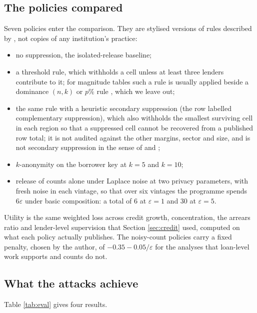 \documentclass[11pt,a4paper]{article}
\theoremstyle{plain}
\theoremstyle{definition}
\begin{document}
\subsection{The policies compared}\label{sec:eval-policies}

Seven policies enter the comparison. They are stylised versions of rules
described by \citet{hundepool2012}, not copies of any institution's practice:

\begin{itemize}
\item no suppression, the isolated-release baseline;
\item a threshold rule, which withholds a cell unless at least three lenders
  contribute to it; for magnitude tables such a rule is usually applied beside a
  dominance $(n,k)$ or $p\%$ rule \citep[ch.~4]{hundepool2012}, which we leave out;
\item the same rule with a heuristic secondary suppression (the row labelled
  complementary suppression), which also withholds the smallest surviving cell in
  each region so that a suppressed cell cannot be recovered from a published row
  total; it is not audited against the other margins, sector and size, and is not
  secondary suppression in the sense of \citet{cox1980} and
  \citet{fischetti2001};
\item $k$-anonymity on the borrower key at $k = 5$ and $k = 10$;
\item release of counts alone under Laplace noise at two privacy parameters,
  with fresh noise in each vintage, so that over six vintages the programme spends
  $6\varepsilon$ under basic composition: a total of 6 at $\varepsilon = 1$ and
  30 at $\varepsilon = 5$.
\end{itemize}

Utility is the same weighted loss across credit growth, concentration, the arrears
ratio and lender-level supervision that Section \ref{sec:credit} used, computed on
what each policy actually publishes. The noisy-count policies carry a fixed
penalty, chosen by the author, of $-0.35 - 0.05/\varepsilon$ for the analyses
that loan-level work supports and counts do not.



\subsection{What the attacks achieve}\label{sec:eval-results}

Table \ref{tab:eval} gives four results.
\end{document}
